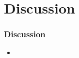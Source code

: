 \section{Discussion}

\begin{frame}
	\frametitle{Discussion}
	\begin{itemize}
		\item
	\end{itemize}
\end{frame}
